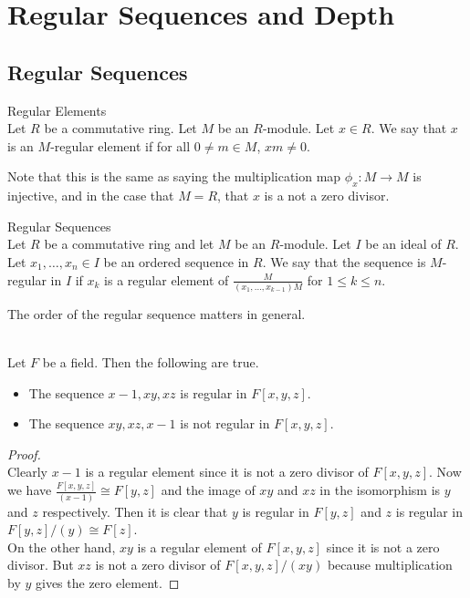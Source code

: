 \documentclass[a4paper]{article}
\begin{document}
\section{Regular Sequences and Depth}
\subsection{Regular Sequences}
\begin{defn}{Regular Elements}{}\\
Let $R$ be a commutative ring. Let $M$ be an $R$-module. Let $x\in R$. We say that $x$ is an $M$-regular element if for all $0\neq m\in M$, $xm\neq 0$. 
\end{defn}

Note that this is the same as saying the multiplication map $\phi_x:M\to M$ is injective, and in the case that $M=R$, that $x$ is a not a zero divisor. 

\begin{defn}{Regular Sequences}{}\\
Let $R$ be a commutative ring and let $M$ be an $R$-module. Let $I$ be an ideal of $R$. Let $x_1,\dots,x_n\in I$ be an ordered sequence in $R$. We say that the sequence is $M$-regular in $I$ if $x_k$ is a regular element of $\frac{M}{(x_1,\dots,x_{k-1})M}$ for $1\leq k\leq n$. 
\end{defn}

The order of the regular sequence matters in general. 

\begin{eg}{}{}\\
Let $F$ be a field. Then the following are true. 
\begin{itemize}
\item The sequence $x-1,xy,xz$ is regular in $F[x,y,z]$. 
\item The sequence $xy,xz,x-1$ is not regular in $F[x,y,z]$. 
\end{itemize}
\begin{proof}\\
Clearly $x-1$ is a regular element since it is not a zero divisor of $F[x,y,z]$. Now we have $\frac{F[x,y,z]}{(x-1)}\cong F[y,z]$ and the image of $xy$ and $xz$ in the isomorphism is $y$ and $z$ respectively. Then it is clear that $y$ is regular in $F[y,z]$ and $z$ is regular in $F[y,z]/(y)\cong F[z]$. \\

On the other hand, $xy$ is a regular element of $F[x,y,z]$ since it is not a zero divisor. But $xz$ is not a zero divisor of $F[x,y,z]/(xy)$ because multiplication by $y$ gives the zero element. 
\end{proof}
\end{eg}
\end{document}
